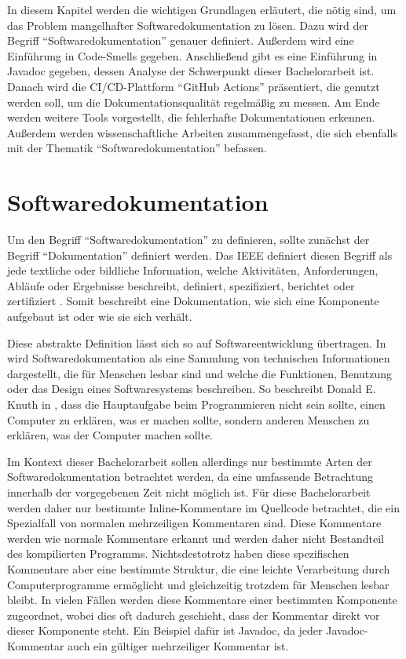 \label{sec:background}
In diesem Kapitel werden die wichtigen Grundlagen erläutert, die nötig sind, um das Problem mangelhafter Softwaredokumentation zu lösen.  Dazu  wird der Begriff \enquote{Softwaredokumentation} genauer definiert. Außerdem wird eine Einführung in Code-Smells gegeben.  Anschließend gibt es eine Einführung in Javadoc gegeben, dessen Analyse der Schwerpunkt dieser Bachelorarbeit ist. Danach wird die \ac{CI/CD}-Plattform \enquote{GitHub Actions} präsentiert, die genutzt werden soll, um die Dokumentationsqualität regelmäßig zu messen. Am Ende werden weitere Tools vorgestellt, die fehlerhafte Dokumentationen erkennen. Außerdem werden wissenschaftliche Arbeiten zusammengefasst, die sich ebenfalls mit der Thematik \enquote{Softwaredokumentation} befassen. 
 

\section{Softwaredokumentation}\label{chapter:documentation}
Um den Begriff \enquote{Softwaredokumentation} zu definieren, sollte zunächst der Begriff \enquote{Dokumentation} definiert werden. Das IEEE  definiert diesen Begriff als jede textliche oder bildliche Information, welche Aktivitäten, Anforderungen, Abläufe oder Ergebnisse beschreibt, definiert, spezifiziert, berichtet oder zertifiziert \cite[S. 28]{IEEEStandardGlossaryofSoftwareEngineeringTerminology}. Somit beschreibt eine Dokumentation, wie sich eine Komponente aufgebaut ist oder wie sie sich verhält.

Diese abstrakte Definition lässt sich so auf Softwareentwicklung übertragen. In \cite[S. 125]{Softwaredocumentationandstandards} wird Softwaredokumentation als eine Sammlung von technischen Informationen dargestellt, die für Menschen lesbar sind und welche die Funktionen, Benutzung oder das Design eines Softwaresystems beschreiben. So beschreibt Donald E. Knuth in \cite[S. 97]{LiterateProgramming}, dass die Hauptaufgabe beim Programmieren nicht sein sollte, einen Computer zu erklären, was er machen sollte, sondern anderen Menschen zu erklären, was der Computer machen sollte.

Im Kontext dieser Bachelorarbeit sollen allerdings nur bestimmte Arten der Softwaredokumentation betrachtet werden, da eine umfassende Betrachtung innerhalb der vorgegebenen Zeit nicht möglich ist. 
Für diese Bachelorarbeit werden daher nur bestimmte Inline-Kommentare im Quellcode betrachtet, die ein Spezialfall von normalen mehrzeiligen Kommentaren sind. Diese Kommentare werden wie normale Kommentare erkannt und werden daher nicht Bestandteil des kompilierten Programms. Nichtsdestotrotz haben diese spezifischen Kommentare aber eine bestimmte Struktur, die eine leichte Verarbeitung durch Computerprogramme ermöglicht und gleichzeitig trotzdem für Menschen lesbar bleibt. In vielen Fällen werden diese Kommentare einer bestimmten Komponente zugeordnet, wobei dies oft dadurch geschieht, dass der Kommentar direkt vor dieser Komponente steht. Ein Beispiel dafür ist Javadoc, da jeder Javadoc-Kommentar auch ein gültiger mehrzeiliger Kommentar ist. 

